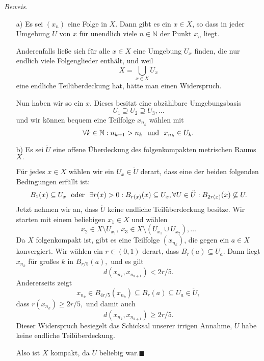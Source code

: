 \documentclass[12pt]{scrbook}   %
\newcommand{\qed}{\phantom{.}\hfill{$\blacksquare$}}
\begin{document}
{\it Beweis.} 
\begin{itemize}
\item[a)] Es sei $(x_n)$ eine Folge in $X.$ Dann gibt es ein $x\in X$, so dass
in jeder Umgebung $U$ von $x$ für unendlich viele $n\in \mathbb N$ der Punkt
$x_n$ liegt. 

Anderenfalls ließe sich für alle $x\in X$ eine Umgebung $U_x$ finden, die
nur endlich viele Folgenglieder enthält, und weil 
$$X=\bigcup_{x\in X} U_x$$
eine endliche Teilüberdeckung hat, hätte man einen Widerspruch.

Nun haben wir so ein $x.$ Dieses besitzt eine abzählbare Umgebungsbasis
$$U_1\supseteq U_2 \supseteq U_3,\dots$$
und wir können bequem eine Teilfolge $x_{n_k}$ wählen mit 
$$\forall k\in \mathbb N:n_{k+1} > n_{k} \ \ {\rm und }\ \ x_{n_k}\in U_k.$$
\item[b)] Es sei $\ddot U$ eine offene Überdeckung des folgenkompakten 
metrischen Raums $X.$ 

Für jedes $x\in X$ wählen wir ein $U_x\in \ddot U$ derart, dass eine der
beiden folgenden Bedingungen erfüllt ist:
$$B_1(x)\subseteq U_x\ \ {\rm  oder }\ \ 
\exists r(x)>0 : B_{r(x)}(x)\subseteq U_x, \forall U\in \ddot U: 
B_{2r(x)}(x)\not\subseteq U.$$
Jetzt nehmen wir an, dass $\ddot U$ keine endliche Teilüberdeckung besitze.
Wir starten mit einem beliebigen $x_1\in X$ und wählen 
$$x_2\in X\setminus U_{x_1},\ 
x_3\in X\setminus(U_{x_1}\cup U_{x_2}),\dots$$
Da $X$ folgenkompakt ist, gibt es eine Teilfolge $(x_{n_k})$, die gegen ein
$a\in X$ konvergiert. Wir wählen ein $r\in (0,1)$ derart, dass
$B_r(a)\subseteq U_a.$ Dann liegt $x_{n_k}$  für 
großes $k$ in $B_{r/5}(a),$ und es gilt 
$$d(x_{n_k},x_{n_{k+1}}) < 2r/5.$$
Andererseits zeigt
$$x_{n_k}\in B_{4r/5}(x_{n_k})\subseteq B_{r}(a)\subseteq U_a\in \ddot U,$$
dass $r(x_{n_k})\geq 2r/5,$ und damit auch 
$$d(x_{n_k},x_{n_{k+1}}) \geq 2r/5.$$
Dieser Widerspruch besiegelt das Schicksal unserer irrigen Annahme, $\ddot U$
habe keine endliche Teilüberdeckung. 

Also ist $X$ kompakt, da $\ddot U$ beliebig war.\qed
\end{itemize}
\end{document}
